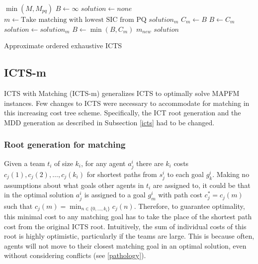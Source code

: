 \documentclass[english]{article}
\begin{document}
	
	
	
	\begin{algorithm}
		\begin{algorithmic}[1]
			\State {}$\min(M,M_{pq})$
			\State $B \gets \infty$
			\State $solution \gets none$
			\Repeat
			\State $m\gets\text{Take matching with lowest SIC from PQ}$
			\State $solution_m$  $C_m\gets$$B$ 
			\State $B\gets C_m$
			\State $solution \gets solution_m$
			\EndIf
			\State $B\gets\min(B,C_m)$
			\State {}$m_{new}$
			\EndIf
			\Return $solution$
		\end{algorithmic}
		\caption{Approximate ordered exhaustive ICTS} 
		\label{pq-algo}
	\end{algorithm}
	
	\subsection{ICTS-m}
	ICTS with Matching (ICTS-m) generalizes ICTS to optimally solve MAPFM instances. Few changes to ICTS were necessary to accommodate for matching in this increasing cost tree scheme. Specifically, the ICT root generation and the MDD generation as described in Subsection \ref{icts} had to be changed.
	\subsubsection{Root generation for matching}
	Given a team $t_i$ of size $k_i$, for any agent $a_j^i$ there are $k_i$ costs $c_j(1),c_j(2),\ldots,c_j(k_i)$ for shortest paths from $s_j^i$ to each goal $g_k^i$. Making no assumptions about what goals other agents in $t_i$ are assigned to, it could be that in the optimal solution $a_j^i$ is assigned to a goal $g_{m}^i$ with path cost $c^*_j = c_j(m)$ such that $c_j(m) = \min_{n\in\{0,\ldots,k_i\}} c_j(n)$. Therefore, to guarantee optimality, this minimal cost to any matching goal has to take the place of the shortest path cost from the original ICTS root. Intuitively, the sum of individual costs of this root is highly optimistic, particularly if the teams are large. This is because often, agents will not move to their closest matching goal in an optimal solution, even without considering conflicts (see \ref{pathology}).
	
\end{document}
